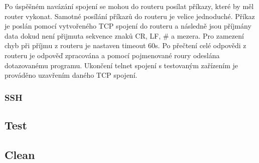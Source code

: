 Po úspěšném navázání spojení se mohou do routeru posílat příkazy, které by měl router vykonat. Samotné posílání příkazů do routeru je velice jednoduché. Příkaz je poslán pomocí vytvořeného TCP spojení do routeru a následně jsou příjmány data dokud není přijmuta sekvence znaků CR, LF, \# a mezera. Pro zamezení chyb při příjmu z routeru je nastaven timeout 60s. Po přečtení celé odpovědi z routeru je odpověď zpracována a pomocí pojmenované roury odeslána dotazovanému programu. Ukončení telnet spojení s testovaným zařízením je prováděno uzavřením daného TCP spojení.


\subsubsection{SSH}

\subsection{Test}
\subsection{Clean}


\endinput
